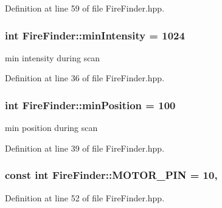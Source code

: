 Definition at line 59 of file Fire\-Finder.\-hpp.

\hypertarget{classFireFinder_a7d3912a911843b60de3468588cfe8579}{
\subsubsection[{min\-Intensity}]{\setlength{\rightskip}{0pt plus 5cm}int Fire\-Finder\-::min\-Intensity = 1024\hspace{0.3cm}{\ttfamily [private]}}}\label{classFireFinder_a7d3912a911843b60de3468588cfe8579}


min intensity during scan 



Definition at line 36 of file Fire\-Finder.\-hpp.

\hypertarget{classFireFinder_ad8be0837d88f10d65b6f8a405f29494a}{
\subsubsection[{min\-Position}]{\setlength{\rightskip}{0pt plus 5cm}int Fire\-Finder\-::min\-Position = 100\hspace{0.3cm}{\ttfamily [private]}}}\label{classFireFinder_ad8be0837d88f10d65b6f8a405f29494a}


min position during scan 



Definition at line 39 of file Fire\-Finder.\-hpp.

\hypertarget{classFireFinder_ac29b178da56a9347787371708bb62a20}{
\subsubsection[{M\-O\-T\-O\-R\-\_\-\-P\-I\-N}]{\setlength{\rightskip}{0pt plus 5cm}const int Fire\-Finder\-::\-M\-O\-T\-O\-R\-\_\-\-P\-I\-N = 10\hspace{0.3cm}{\ttfamily [static]}, {\ttfamily [private]}}}\label{classFireFinder_ac29b178da56a9347787371708bb62a20}


Definition at line 52 of file Fire\-Finder.\-hpp.

